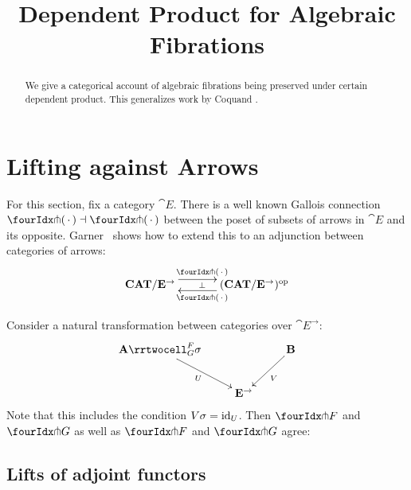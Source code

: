 \documentclass[reqno,10pt,a4paper,oneside]{amsart}
\title{Dependent Product for Algebraic Fibrations}
\begin{document}
\begin{abstract}
We give a categorical account of algebraic fibrations being preserved under certain dependent product.
This generalizes work by Coquand \etal.
\end{abstract}

\maketitle

\tableofcontents

\section{Lifting against Arrows}

For this section, fix a category $\cat{E}$.
There is a well known Gallois connection $\liftr{\brarghole} \dashv \liftl{\brarghole}$ between the poset of subsets of arrows in $\cat{E}$ and its opposite.
Garner~\cite{garner:small-object-argument} shows how to extend this to an adjunction between categories of arrows:
\begin{equation}
\label{garner-adjunction}
\begin{gathered}
\xymatrix@C+1em{
  \CAT/\cat{E}^{\to}
  \ar@<5pt>[r]^{\liftl{\brarghole}}
  \ar@{}[r]|{\bot}
&
  (\CAT/\cat{E}^{\to})^{\op}
  \ar@<5pt>[l]^{\liftr{\brarghole}}
}
\end{gathered}
\end{equation}

\begin{lemma}
Consider a natural transformation between categories over $\cat{E}^{\to}$:
\[
\xymatrix{
  \cat{A}
  \rrtwocell_G^F{\sigma}
 \ar[dr]_{U}
&&
  \cat{B}
  \ar[dl]^{V}
\\&
  \cat{E}^{\to}
}
\]
Note that this includes the condition $V \sigma = \operatorname{id}_U$.
Then $\liftr{F}$ and $\liftr{G}$ as well as $\liftl{F}$ and $\liftl{G}$ agree:
\end{lemma}

\subsection{Lifts of adjoint functors}
\end{document}
